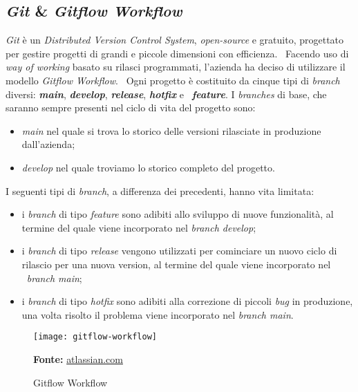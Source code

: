 \subsection{\emph{Git} \& \emph{Gitflow Workflow}}
\emph{Git} è un \emph{Distributed Version Control System}, \emph{open-source} e gratuito, progettato per gestire progetti di grandi e piccole dimensioni con efficienza. \
Facendo uso di \emph{way of working} basato su rilasci programmati, l'azienda ha deciso di utilizzare il modello \emph{Gitflow Workflow}. \
Ogni progetto è costituito da cinque tipi di \emph{branch} diversi: \textbf{\emph{main}}, \textbf{\emph{develop}}, \textbf{\emph{release}}, \textbf{\emph{hotfix}} e \
\textbf{\emph{feature}}. I \emph{branches} di base, che saranno sempre presenti nel ciclo di vita del progetto sono:
\begin{itemize}
  \item \emph{main} nel quale si trova lo storico delle versioni rilasciate in produzione dall'azienda;
  \item \emph{develop} nel quale troviamo lo storico completo del progetto. 
\end{itemize}  

I seguenti tipi di \emph{branch}, a differenza dei precedenti, hanno vita limitata: \
\begin{itemize}
  \item i \emph{branch} di tipo \emph{feature} sono adibiti allo sviluppo di nuove funzionalità, al termine del quale viene incorporato nel \emph{branch develop}; 
  \item i \emph{branch} di tipo \emph{release} vengono utilizzati per cominciare un nuovo ciclo di rilascio per una nuova version, al termine del quale viene incorporato nel \
  \emph{branch main}; 
  \item i \emph{branch} di tipo \emph{hotfix} sono adibiti alla correzione di piccoli \emph{bug} in produzione, una volta risolto il problema viene incorporato nel \emph{branch main}.
\end{itemize}

\vspace{10pt}
  \begin{figure}[!ht]
    \begin{center}
      \texttt{[image: gitflow-workflow]}
      \caption{Gitflow Workflow}
      \textbf{Fonte:} \href{https://www.atlassian.com}{atlassian.com}
    \end{center}
  \end{figure}
\vspace{10pt} 

